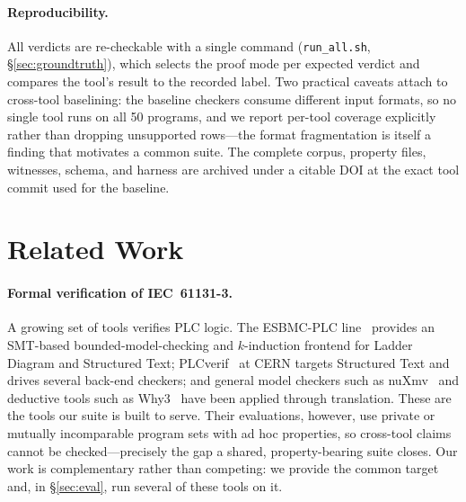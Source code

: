 \paragraph{Reproducibility.}
All verdicts are re-checkable with a single command (\texttt{run\_all.sh},
\S\ref{sec:groundtruth}), which selects the proof mode per expected verdict and compares
the tool's result to the recorded label. Two practical caveats attach to cross-tool
baselining: the baseline checkers consume different input formats, so no single tool runs
on all 50 programs, and we report per-tool coverage explicitly rather than dropping
unsupported rows---the format fragmentation is itself a finding that motivates a common
suite. The complete corpus, property files, witnesses, schema, and harness are archived
under a citable DOI at the exact tool commit used for the baseline.


\section{Related Work}
\label{sec:related}

\paragraph{Formal verification of IEC~61131-3.}
A growing set of tools verifies PLC logic. The ESBMC-PLC line~\cite{esbmcplc,esbmcgraphplc,esbmcplcplus}
provides an SMT-based bounded-model-checking and $k$-induction frontend for Ladder Diagram and
Structured Text; PLCverif~\cite{plcverif,plcverif2} at CERN targets Structured Text and drives
several back-end checkers; and general model checkers such as nuXmv~\cite{nuxmv} and deductive
tools such as Why3~\cite{why3} have been applied through translation. These are the tools our
suite is built to serve. Their evaluations, however, use private or mutually incomparable
program sets with ad hoc properties, so cross-tool claims cannot be checked---precisely the gap
a shared, property-bearing suite closes. Our work is complementary rather than competing: we
provide the common target and, in \S\ref{sec:eval}, run several of these tools on it.

